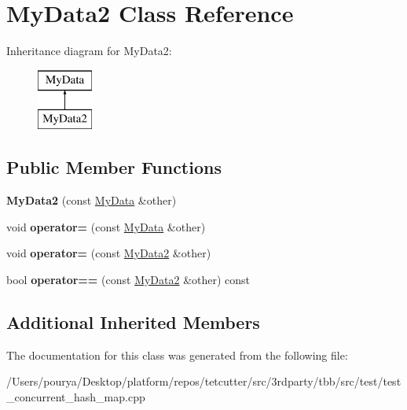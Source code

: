 \hypertarget{classMyData2}{}\section{My\+Data2 Class Reference}
\label{classMyData2}
Inheritance diagram for My\+Data2\+:\begin{figure}[H]
\begin{center}
\leavevmode
\includegraphics[height=2.000000cm]{classMyData2}
\end{center}
\end{figure}
\subsection*{Public Member Functions}
\begin{DoxyCompactItemize}
\item 
\hypertarget{classMyData2_a56bada9e0c59bc04de5cc983b14d7082}{}{\bfseries My\+Data2} (const \hyperlink{classMyData}{My\+Data} \&other)\label{classMyData2_a56bada9e0c59bc04de5cc983b14d7082}

\item 
\hypertarget{classMyData2_a99a1590402019c6d5e0a14f0967c4387}{}void {\bfseries operator=} (const \hyperlink{classMyData}{My\+Data} \&other)\label{classMyData2_a99a1590402019c6d5e0a14f0967c4387}

\item 
\hypertarget{classMyData2_a03695de4ab7e3524caaf14f79dbb35b9}{}void {\bfseries operator=} (const \hyperlink{classMyData2}{My\+Data2} \&other)\label{classMyData2_a03695de4ab7e3524caaf14f79dbb35b9}

\item 
\hypertarget{classMyData2_a877801dde62a02f238ca322afcb4cce1}{}bool {\bfseries operator==} (const \hyperlink{classMyData2}{My\+Data2} \&other) const \label{classMyData2_a877801dde62a02f238ca322afcb4cce1}

\end{DoxyCompactItemize}
\subsection*{Additional Inherited Members}


The documentation for this class was generated from the following file\+:\begin{DoxyCompactItemize}
\item 
/\+Users/pourya/\+Desktop/platform/repos/tetcutter/src/3rdparty/tbb/src/test/test\+\_\+concurrent\+\_\+hash\+\_\+map.\+cpp\end{DoxyCompactItemize}
